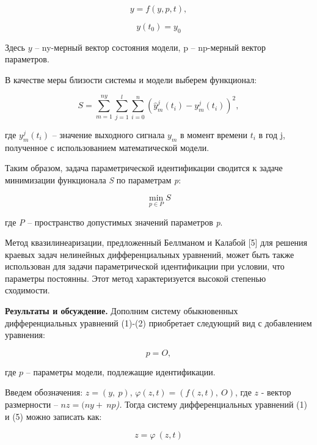 \begin{multicols}{2}
\begin{equation}
y = f(y,p,t),
\end{equation}

\begin{equation}
y\left( t_{0} \right) = y_{0}
\end{equation}

Здесь \(y\) -- ny-мерный вектор состояния модели, p -- np-мерный вектор
параметров.

В качестве меры близости системы и модели выберем функционал:

\begin{equation}
S = \sum_{m = 1}^{ny}{\sum_{j = 1}^{l}{\sum_{i = 0}^{n}{({\widehat{y}}_{m}^{j}\left( t_{i} \right) - y_{m}^{j}\left( t_{i} \right))}^{2}}},
\end{equation}

где \(y_{m}^{j}(t_{i})\) -- значение
выходного сигнала \(y_{m}\) в момент времени \(t_{i}\) в год j,
полученное с использованием математической модели.

Таким образом, задача параметрической идентификации сводится к задаче
минимизации функционала \emph{S} по параметрам \emph{p}:

\begin{equation}
\min_{p \in P}S
\end{equation}

где \emph{P} -- пространство допустимых значений параметров \emph{p}.

Метод квазилинеаризации, предложенный Беллманом и Калабой {[}5{]} для
решения краевых задач нелинейных дифференциальных уравнений, может быть
также использован для задачи параметрической идентификации при условии,
что параметры постоянны. Этот метод характеризуется высокой степенью
сходимости.

{\bfseries Результаты и обсуждение.} Дополним систему обыкновенных
дифференциальных уравнений (1)-(2) приобретает следующий вид с
добавлением уравнения:

\begin{equation}
p = O,
\end{equation}

где \(p\) -- параметры модели, подлежащие идентификации.

Введем обозначения: \(z = (y,\ p)\),
\(\varphi(z,t) = \left( f(z,t),\ O \right)\), где \(z\) - вектор
размерности -- \(nz = (ny + \ np\)\emph{).} Тогда систему
дифференциальных уравнений (1) и (5) можно записать как:

\begin{equation}
z = \varphi\ (z,t)
\end{equation}


\end{multicols}
